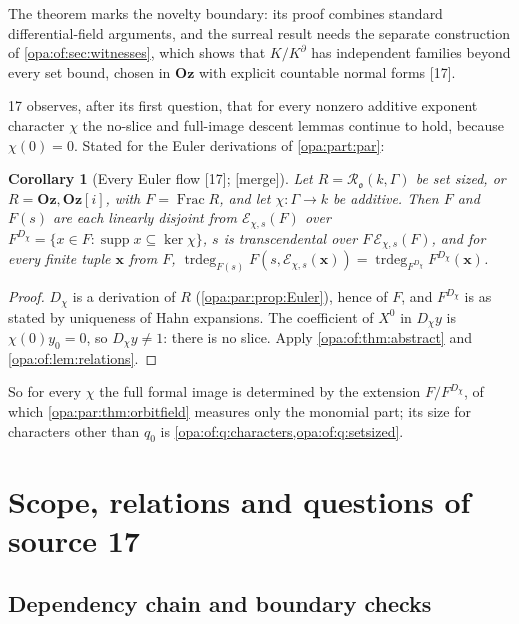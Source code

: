 \documentclass[11pt,oneside]{article}
\numberwithin{equation}{section}
\newtheorem{corollary}[corollary]{Corollary}
\theoremstyle{definition}
\theoremstyle{remark}
\newcommand{\Oz}{\mathbf{Oz}}
\newcommand{\Og}{\mathbf{Oz}[i]}
\newcommand{\oo}{\mathfrak o}
\newcommand{\EE}{\mathcal E}
\newcommand{\supp}{\operatorname{supp}}
\newcommand{\Frac}{\operatorname{Frac}}
\newcommand{\trdeg}{\operatorname{trdeg}}
\newcommand{\src}[1]{\textup{\textsf{\small[#1]}}}
\newcommand{\mergetag}{\textup{\textsf{\small[merge]}}}
\begin{document}
The theorem marks the novelty boundary: its proof combines standard differential-field arguments, and the surreal result needs
the separate construction of \cref{opa:of:sec:witnesses}, which shows that $K/K^\partial$ has independent families beyond every
set bound, chosen in $\Oz$ with explicit countable normal forms \src{17}.

17 observes, after its first question, that for every nonzero additive exponent character $\chi$ the no-slice and full-image
descent lemmas continue to hold, because $\chi(0)=0$. Stated for the Euler derivations of \cref{opa:part:par}:

\begin{corollary}[Every Euler flow \src{17}; \mergetag]\label{opa:of:cor:allchi}
Let $R=\mathcal R_\oo(k,\Gamma)$ be set sized, or $R=\Oz,\Og$, with $F=\Frac R$, and let $\chi:\Gamma\to k$ be additive. Then $F$ and
$F(s)$ are each linearly disjoint from $\EE_{\chi,s}(F)$ over $F^{D_\chi}=\{x\in F:\supp x\subseteq\ker\chi\}$, $s$ is transcendental over
$F\,\EE_{\chi,s}(F)$, and for every finite tuple $\mathbf x$ from $F$,
$\trdeg_{F(s)}F(s,\EE_{\chi,s}(\mathbf x))=\trdeg_{F^{D_\chi}}F^{D_\chi}(\mathbf x)$.
\end{corollary}
\begin{proof}
$D_\chi$ is a derivation of $R$ (\cref{opa:par:prop:Euler}), hence of $F$, and $F^{D_\chi}$ is as stated by uniqueness of Hahn
expansions. The coefficient of $X^0$ in $D_\chi y$ is $\chi(0)y_0=0$, so $D_\chi y\ne1$: there is no slice. Apply
\cref{opa:of:thm:abstract} and \cref{opa:of:lem:relations}.
\end{proof}

So for every $\chi$ the full formal image is determined by the extension $F/F^{D_\chi}$, of which \cref{opa:par:thm:orbitfield}
measures only the monomial part; its size for characters other than $q_0$ is \cref{opa:of:q:characters,opa:of:q:setsized}.

\section{Scope, relations and questions of source 17}\label{opa:of:sec:questions}

\subsection{Dependency chain and boundary checks}
\end{document}
